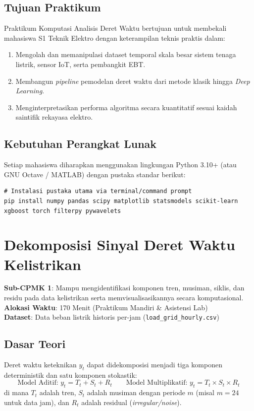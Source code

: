 \documentclass[11pt,a4paper]{report}
\begin{document}
\section*{Tujuan Praktikum}
Praktikum Komputasi Analisis Deret Waktu bertujuan untuk membekali mahasiswa S1 Teknik Elektro dengan keterampilan teknis praktis dalam:
\begin{enumerate}
    \item Mengolah dan memanipulasi dataset temporal skala besar sistem tenaga listrik, sensor IoT, serta pembangkit EBT.
    \item Membangun \textit{pipeline} pemodelan deret waktu dari metode klasik hingga \textit{Deep Learning}.
    \item Menginterpretasikan performa algoritma secara kuantitatif sesuai kaidah saintifik rekayasa elektro.
\end{enumerate}

\section*{Kebutuhan Perangkat Lunak}
Setiap mahasiswa diharapkan menggunakan lingkungan Python 3.10+ (atau GNU Octave / MATLAB) dengan pustaka standar berikut:
\begin{lstlisting}
# Instalasi pustaka utama via terminal/command prompt
pip install numpy pandas scipy matplotlib statsmodels scikit-learn xgboost torch filterpy pywavelets
\end{lstlisting}

\newpage

\chapter{Dekomposisi Sinyal Deret Waktu Kelistrikan}

\begin{tcolorbox}[title=Informasi Modul 1]
\textbf{Sub-CPMK 1}: Mampu mengidentifikasi komponen tren, musiman, siklis, dan residu pada data kelistrikan serta memvisualisasikannya secara komputasional.\\
\textbf{Alokasi Waktu}: 170 Menit (Praktikum Mandiri \& Asistensi Lab)\\
\textbf{Dataset}: Data beban listrik historis per-jam (\texttt{load\_grid\_hourly.csv})
\end{tcolorbox}

\section{Dasar Teori}
Deret waktu keteknikan $y_t$ dapat didekomposisi menjadi tiga komponen deterministik dan satu komponen stokastik:
\begin{equation}
    \text{Model Aditif: } y_t = T_t + S_t + R_t \qquad \text{Model Multiplikatif: } y_t = T_t \times S_t \times R_t
\end{equation}
di mana $T_t$ adalah tren, $S_t$ adalah musiman dengan periode $m$ (misal $m=24$ untuk data jam), dan $R_t$ adalah residual (\textit{irregular/noise}).
\end{document}

